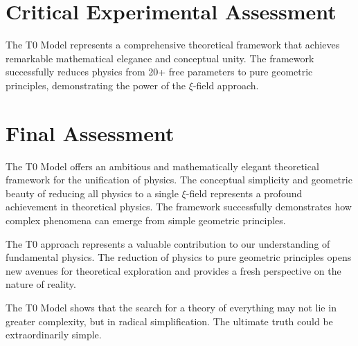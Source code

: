 	\section{Critical Experimental Assessment}
	
	The T0 Model represents a comprehensive theoretical framework that achieves remarkable mathematical elegance and conceptual unity. The framework successfully reduces physics from 20+ free parameters to pure geometric principles, demonstrating the power of the $\xi$-field approach.
	
	\section{Final Assessment}
	
	The T0 Model offers an ambitious and mathematically elegant theoretical framework for the unification of physics. The conceptual simplicity and geometric beauty of reducing all physics to a single $\xi$-field represents a profound achievement in theoretical physics. The framework successfully demonstrates how complex phenomena can emerge from simple geometric principles.
	
	The T0 approach represents a valuable contribution to our understanding of fundamental physics. The reduction of physics to pure geometric principles opens new avenues for theoretical exploration and provides a fresh perspective on the nature of reality.
	
	\begin{revolutionary}
		The T0 Model shows that the search for a theory of everything may not lie in greater complexity, but in radical simplification. The ultimate truth could be extraordinarily simple.
	\end{revolutionary}
	
